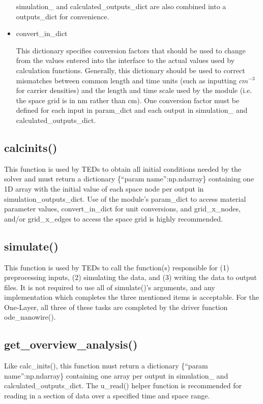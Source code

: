 \documentclass[11pt,letterpaper,titlepage]{article}
\begin{document}
\begin{itemize}
			\par simulation\_ and calculated\_outputs\_dict are also combined into a outputs\_dict for convenience.
			
			\item convert\_in\_dict
			\par This dictionary specifies conversion factors that should be used to change from the values entered into the interface to the actual values used by calculation functions. Generally, this dictionary should be used to correct mismatches between common length and time units (such as inputting $cm^{-3}$ for carrier densities) and the length and time scale used by the module (i.e. the space grid is in nm rather than cm). One conversion factor must be defined for each input in param\_dict and each output in simulation\_ and calculated\_outputs\_dict.
		\end{itemize}
	
		\subsection{calc\textunderscore inits()}
		\par This function is used by TEDs to obtain all initial conditions needed by the solver and must return a dictionary \{“param name”:np.ndarray\} containing one 1D array with the initial value of each space node per output in simulation\_outputs\_dict. Use of the module’s param\_dict to access material parameter values, convert\_in\_dict for unit conversions, and grid\_x\_nodes, and/or grid\_x\_edges to access the space grid is highly recommended.
		
		\subsection{simulate()}
		\par This function is used by TEDs to call the function(s) responsible for (1) preprocessing inputs, (2) simulating the data, and (3) writing the data to output files. It is not required to use all of simulate()’s arguments, and any implementation which completes the three mentioned items is acceptable. For the One-Layer, all three of these tasks are completed by the driver function ode\_nanowire().
		
		\subsection{get\_overview\_analysis()}
		\par Like calc\_inits(), this function must return a dictionary \{“param name”:np.ndarray\} containing one array per output in simulation\_ and calculated\_outputs\_dict. The u\_read() helper function is recommended for reading in a section of data over a specified time and space range.
		
\end{document}
